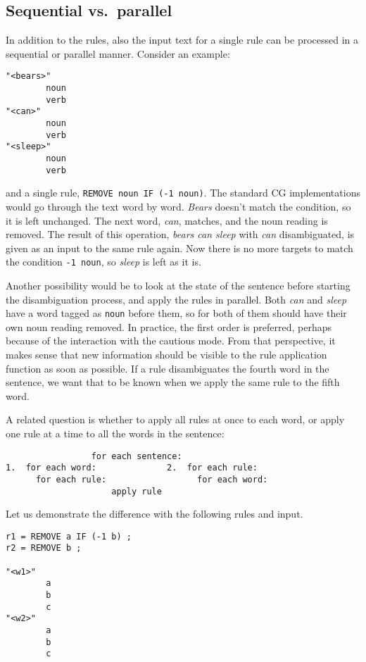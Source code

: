 \subsection{Sequential vs.~parallel}\label{sequential-vs.parallel}

In addition to the rules, also the input text for a single rule can be
processed in a sequential or parallel manner. Consider an example:

\begin{verbatim}
"<bears>"
        noun
        verb
"<can>"
        noun
        verb
"<sleep>"
        noun
        verb
\end{verbatim}

and a single rule, \texttt{REMOVE noun IF (-1 noun)}. The standard CG
implementations would go through the text word by word. \emph{Bears}
doesn't match the condition, so it is left unchanged. The next word,
\emph{can}, matches, and the noun reading is removed. The result of this
operation, \emph{bears can sleep} with \emph{can} disambiguated, is
given as an input to the same rule again. Now there is no more targets
to match the condition \texttt{-1 noun}, so \emph{sleep} is left as it
is.

Another possibility would be to look at the state of the sentence before
starting the disambiguation process, and apply the rules in parallel.
Both \emph{can} and \emph{sleep} have a word tagged as \texttt{noun}
before them, so for both of them should have their own noun reading
removed. In practice, the first order is preferred, perhaps because of
the interaction with the cautious mode. From that perspective, it makes
sense that new information should be visible to the rule application
function as soon as possible. If a rule disambiguates the fourth word in
the sentence, we want that to be known when we apply the same rule to
the fifth word.

A related question is whether to apply all rules at once to each word,
or apply one rule at a time to all the words in the sentence:

\begin{verbatim}
                 for each sentence:
1.  for each word:              2.  for each rule:
      for each rule:                  for each word:
                     apply rule
\end{verbatim}

Let us demonstrate the difference with the following rules and input.

\begin{verbatim}
r1 = REMOVE a IF (-1 b) ;
r2 = REMOVE b ;

"<w1>"
        a
        b
        c
"<w2>"
        a
        b
        c
\end{verbatim}


